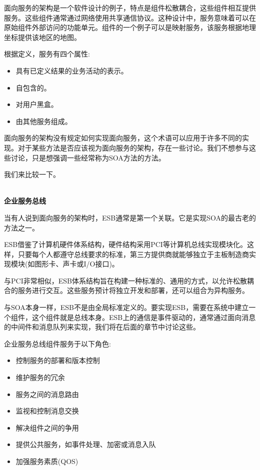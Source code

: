
面向服务的架构是一个软件设计的例子，特点是组件松散耦合，这些组件相互提供服务。这些组件通常通过网络使用共享通信协议。这种设计中，服务意味着可以在原始组件外部访问的功能单元。组件的一个例子可以是映射服务，该服务根据地理坐标提供该地区的地图。

根据定义，服务有四个属性:

\begin{itemize}
\item 
具有已定义结果的业务活动的表示。

\item 
自包含的。

\item 
对用户黑盒。

\item 
由其他服务组成。
\end{itemize}


面向服务的架构没有规定如何实现面向服务，这个术语可以应用于许多不同的实现。对于某些方法是否应该视为面向服务的架构，存在一些讨论。我们不想参与这些讨论，只是想强调一些经常称为SOA方法的方法。

我们来比较一下。

\hspace*{\fill} \\ %
\noindent
\textbf{企业服务总线}

当有人说到面向服务的架构时，ESB通常是第一个关联。它是实现SOA的最古老的方法之一。

ESB借鉴了计算机硬件体系结构，硬件结构采用PCI等计算机总线实现模块化。这样，只要每个人都遵守总线要求的标准，第三方提供商就能够独立于主板制造商实现模块(如图形卡、声卡或I/O接口)。

与PCI非常相似，ESB体系结构旨在构建一种标准的、通用的方式，以允许松散耦合的服务进行交互。这些服务预计将独立开发和部署，还可以组合为异构服务。

与SOA本身一样，ESB不是由全局标准定义的。要实现ESB，需要在系统中建立一个组件，这个组件就是总线本身。ESB上的通信是事件驱动的，通常通过面向消息的中间件和消息队列来实现，我们将在后面的章节中讨论这些。

企业服务总线组件服务于以下角色:

\begin{itemize}
\item 
控制服务的部署和版本控制

\item 
维护服务的冗余

\item 
服务之间的消息路由

\item 
监视和控制消息交换

\item 
解决组件之间的争用

\item 
提供公共服务，如事件处理、加密或消息入队

\item 
加强服务素质(QOS)
\end{itemize}

